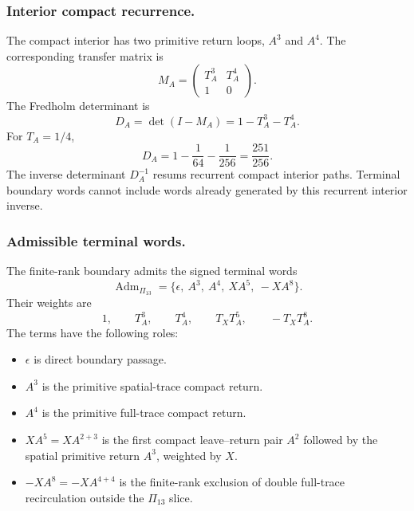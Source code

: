 \documentclass[11pt]{article}
\begin{document}
\subsubsection{Interior compact recurrence.}
\label{app:compact-recurrence}

The compact interior has two primitive return loops, \(A^3\) and \(A^4\). The corresponding transfer matrix is
\begin{equation}
\boxed{
M_A
=
\begin{pmatrix}
T_A^3&T_A^4\\
1&0
\end{pmatrix}.
}
\end{equation}
The Fredholm determinant is
\begin{equation}
\boxed{
D_A
=
\det(I-M_A)
=
1-T_A^3-T_A^4.
}
\end{equation}
For \(T_A=1/4\),
\begin{equation}
\boxed{
D_A
=
1-\frac1{64}-\frac1{256}
=
\frac{251}{256}.
}
\end{equation}
The inverse determinant \(D_A^{-1}\) resums recurrent compact interior paths. Terminal boundary words cannot include words already generated by this recurrent interior inverse.

\subsubsection{Admissible terminal words.}
\label{app:terminal-words}

The finite-rank boundary admits the signed terminal words
\begin{equation}
\boxed{
\operatorname{Adm}_{\Pi_{13}}
=
\{\epsilon,\ A^3,\ A^4,\ XA^5,\ -XA^8\}.
}
\end{equation}
Their weights are
\begin{equation}
\boxed{
1,
\qquad
T_A^3,
\qquad
T_A^4,
\qquad
T_XT_A^5,
\qquad
-T_XT_A^8.
}
\end{equation}
The terms have the following roles:
\begin{itemize}
\item \(\epsilon\) is direct boundary passage.
\item \(A^3\) is the primitive spatial-trace compact return.
\item \(A^4\) is the primitive full-trace compact return.
\item \(XA^5=XA^{2+3}\) is the first compact leave--return pair \(A^2\) followed by the spatial primitive return \(A^3\), weighted by \(X\).
\item \(-XA^8=-XA^{4+4}\) is the finite-rank exclusion of double full-trace recirculation outside the \(\Pi_{13}\) slice.
\end{itemize}
\end{document}
